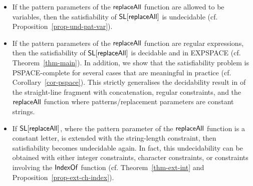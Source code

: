 \begin{itemize}
\item If the pattern parameters of the $\mathsf{replaceAll}$ function are allowed to be variables, then the satisfiability of $\mathsf{SL}[\mathsf{replaceAll}]$ is undecidable (cf. Proposition~\ref{prop-und-pat-var}).
%
\item If the pattern parameters of the $\mathsf{replaceAll}$ function are regular
    expressions, then the satisfiability of $\mathsf{SL}[\mathsf{replaceAll}]$ is decidable
        and in EXPSPACE (cf. Theorem~\ref{thm-main}). In addition, we show that
        the satisfiability problem is PSPACE-complete for several cases that are
        meaningful in practice (cf. Corollary~\ref{cor-pspace}). This strictly
        generalises the decidability result in \cite{LB16} of the straight-line 
        fragment with concatenation, regular constraints, and the $\mathsf{replaceAll}$ 
        function where
        patterns/replacement parameters are constant strings.
%
\item If $\mathsf{SL}[\mathsf{replaceAll}]$, where the pattern parameter of the
    $\mathsf{replaceAll}$ function is a constant letter, is extended with the 
        string-length constraint, then satisfiability becomes undecidable
        again. In fact, this undecidability can be obtained with
        either integer constraints, character constraints, or constraints 
        involving the $\mathsf{IndexOf}$ function
        (cf. Theorem~\ref{thm-ext-int} and 
        Proposition~\ref{prop-ext-ch-index}).
\end{itemize}

